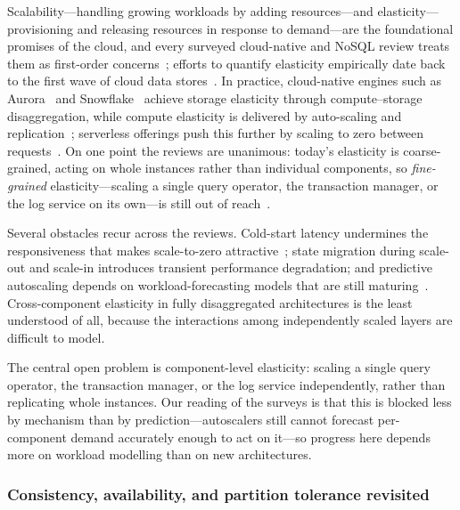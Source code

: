 \documentclass[a4paper,fleqn]{cas-sc}
\begin{document}
Scalability---handling growing workloads by adding resources---and elasticity---provisioning and releasing resources in response to demand---are the foundational promises of the cloud, and every surveyed cloud-native and NoSQL review treats them as first-order concerns~\cite{Li2024CloudNativeSurvey,Davoudian2018NoSQL}; efforts to quantify elasticity empirically date back to the first wave of cloud data stores~\cite{Dory2011Elasticity}. In practice, cloud-native engines such as Aurora~\cite{Verbitski2017} and Snowflake~\cite{Dageville2016} achieve storage elasticity through compute--storage disaggregation, while compute elasticity is delivered by auto-scaling and replication~\cite{Thara2013DaaSPerf}; serverless offerings push this further by scaling to zero between requests~\cite{Muller2020Serverless}. On one point the reviews are unanimous: today's elasticity is coarse-grained, acting on whole instances rather than individual components, so \emph{fine-grained} elasticity---scaling a single query operator, the transaction manager, or the log service on its own---is still out of reach~\cite{Li2024CloudNativeSurvey}.

Several obstacles recur across the reviews. Cold-start latency undermines the responsiveness that makes scale-to-zero attractive~\cite{Muller2020Serverless}; state migration during scale-out and scale-in introduces transient performance degradation; and predictive autoscaling depends on workload-forecasting models that are still maturing~\cite{Ma2021LearnedWorkload}. Cross-component elasticity in fully disaggregated architectures is the least understood of all, because the interactions among independently scaled layers are difficult to model.

The central open problem is component-level elasticity: scaling a single query operator, the transaction manager, or the log service independently, rather than replicating whole instances. Our reading of the surveys is that this is blocked less by mechanism than by prediction---autoscalers still cannot forecast per-component demand accurately enough to act on it---so progress here depends more on workload modelling than on new architectures.

\subsubsection{Consistency, availability, and partition tolerance revisited}
\label{subsubsec:consistency}
\end{document}
